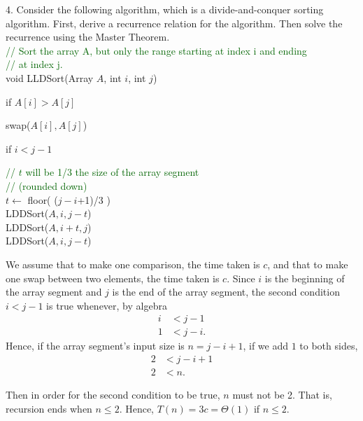 \documentclass{article}
\begin{document}
4. Consider the following algorithm, which is a divide-and-conquer sorting algorithm. First, derive a recurrence relation for the algorithm. Then solve the recurrence using the Master Theorem.\\

\textcolor{darkgreen}{// Sort the array A, but only the range starting at index i and ending}\\
\textcolor{darkgreen}{// at index j.}\\
void LLDSort(Array $A$, int $i$, int $j$)
\begin{adjustwidth}{2.5em}{0pt}
if $A[i] > A[j]$
\end{adjustwidth}
\begin{adjustwidth}{5.0em}{0pt}
swap($A[i], A[j]$)
\end{adjustwidth}
\begin{adjustwidth}{2.5em}{0pt}
if $i < j-1$
\end{adjustwidth}
\begin{adjustwidth}{5.0em}{0pt}
\textcolor{darkgreen}{// $t$ will be 1/3 the size of the array segment}\\
\textcolor{darkgreen}{// (rounded down)}\\
$t \leftarrow$ floor( ($j-i$+1)/3 )\\
LDDSort($A, i, j-t$)\\
LDDSort($A, i+t, j$)\\
LDDSort($A, i, j-t$)
\end{adjustwidth}

We assume that to make one comparison, the time taken is $c$, and that to make one swap between two elements, the time taken is $c$. Since $i$ is the beginning of the array segment and $j$ is the end of the array segment, the second condition $i < j - 1$ is true whenever, by algebra
\begin{align*}
i &< j - 1\\
1 &< j - i.
\end{align*}
Hence, if the array segment's input size is $n = j - i + 1$, if we add $1$ to both sides,
\begin{align*}
2 &< j - i + 1\\
2 &< n.
\end{align*}

Then in order for the second condition to be true, $n$ must not be 2. That is, recursion ends when $n \leq 2$. Hence, $T(n) = 3c = \Theta(1)$ if $n \leq 2$.\\
\end{document}
